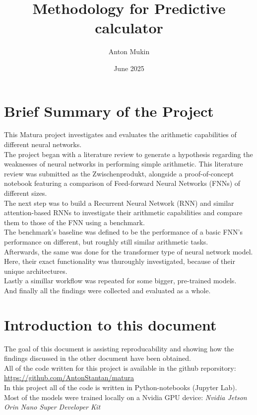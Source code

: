 \documentclass{article}
\title{Methodology for Predictive calculator}
\author{Anton Mukin}
\date{June 2025}
\begin{document}
\maketitle

\section{Brief Summary of the Project}
This Matura project investigates and evaluates the arithmetic capabilities 
of different neural networks. 
\\
The project began with a literature review to 
generate a hypothesis regarding the weaknesses of neural networks in 
performing simple arithmetic. This literature review was submitted as the 
Zwischenprodukt, alongside a proof-of-concept notebook featuring a 
comparison of Feed-forward Neural Networks (FNNs) of different sizes.
\\
The next step was to build a Recurrent Neural Network (RNN) and similar 
attention-based RNNs to investigate their arithmetic capabilities and 
compare them to those of the FNN using a benchmark.
\\
The benchmark's baseline was defined to be the performance of a basic FNN's 
performance on different, but roughly still similar arithmetic tasks.
\\
Afterwards, the same was done for the transformer type of neural network 
model. Here, their exact functionality was thuroughly investigated, because 
of their unique architectures.
\\
Lastly a simillar workflow was repeated for some bigger, pre-trained models. 
\\
And finally all the findings were collected and evaluated as a whole.


\section{Introduction to this document}
The goal of this document is assisting reproducability and showing how the 
findings discussed in the other document have been obtained.
\\[2em]
All of the code written for this project is available in the github 
reporsitory: 
\\
\url{https://github.com/AntonStantan/matura}
\\
In this project all of the code is written in Python-notebooks (Jupyter Lab). 
\\
Most of the models were trained locally on a Nvidia GPU device: \it{Nvidia 
Jetson Orin Nano Super Developer Kit}
\end{document}

